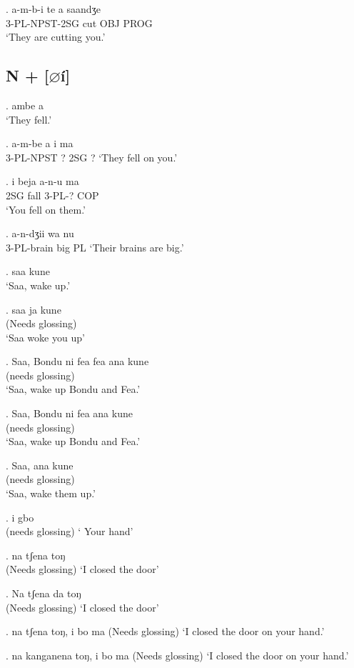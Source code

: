 \documentclass{assets/fieldnotes}
\begin{document}
\ex. a-m-b-i te a saandʒe \\
3-PL-NPST-2SG cut OBJ PROG \\
`They are cutting you.'

\subsection{N + [$\varnothing$í] }


\ex. ambe a \\
`They fell.'

\exg. a-m-be a i ma \\
3-PL-NPST   ?  2SG  ?
`They fell on you.'

\exg. i beja a-n-u ma \\
2SG fall 3-PL-? COP \\
`You fell on them.'

\exg. a-n-dʒii wa nu \\
3-PL-brain big PL
`Their brains are big.'

\ex. saa kune \\
`Saa, wake up.'

\exg. saa ja kune\\
(Needs glossing)\\
`Saa woke you up'

\exg. Saa, Bondu ni fea fea ana kune\\
(needs glossing)\\
`Saa, wake up Bondu and Fea.'

\exg. Saa, Bondu ni fea ana kune\\
(needs glossing)\\
`Saa, wake up Bondu and Fea.'

\exg. Saa, ana kune\\
(needs glossing)\\
`Saa, wake them up.'

\exg. i gbo\\
(needs glossing)
` Your hand'

\exg. na tʃena toŋ\\
(Needs glossing)
`I closed the door'

\exg. Na tʃena da toŋ\\
(Needs glossing)
`I closed the door'

\exg. na tʃena toŋ, i bo ma
(Needs glossing)
`I closed the door on your hand.'

\exg. na kanganena toŋ, i bo ma
(Needs glossing)
`I closed the door on your hand.'
\end{document}
